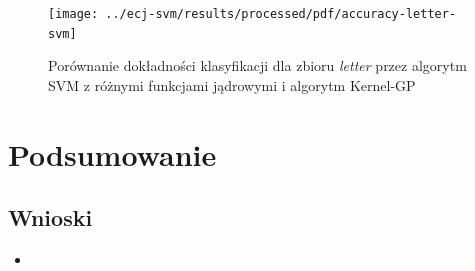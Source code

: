 \documentclass{article}
\begin{document}
		\begin{figure}[ht]
		\texttt{[image: ../ecj-svm/results/processed/pdf/accuracy-letter-svm]}
		\caption{Porównanie dokładności klasyfikacji dla zbioru \emph{letter} przez algorytm SVM z różnymi funkcjami jądrowymi i algorytm Kernel-GP\label{fig:acc-letter-svm}}
	\end{figure}		
		
		
\section{Podsumowanie}
	\subsection{Wnioski}
		\begin{itemize}
			\item 
		\end{itemize}





\end{document}

